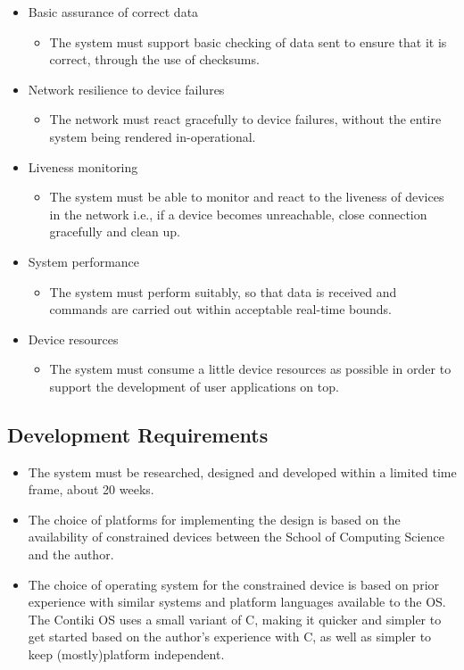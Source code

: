 \begin{itemize}
\begin{itemize}
	\end{itemize}
	\item Basic assurance of correct data
		\begin{itemize}
			\item The system must support basic checking of data sent to ensure that it is correct, through the use of checksums.
		\end{itemize}
	\item Network resilience to device failures
	\begin{itemize}
		\item The network must react gracefully to device failures, without the entire system being rendered in-operational.
	\end{itemize}
	\item Liveness monitoring
	\begin{itemize}
		\item The system must be able to monitor and react to the liveness of devices in the network i.e., if a device becomes unreachable, close connection gracefully and clean up.
	\end{itemize}
	\item System performance
	\begin{itemize}
		\item The system must perform suitably, so that data is received and commands are carried out within acceptable real-time bounds.
	\end{itemize}
	\item Device resources
	\begin{itemize}
		\item The system must consume a little device resources as possible in order to support the development of user applications on top.
	\end{itemize}
\end{itemize}


\subsection{Development Requirements} %
\label{sub:development_requirements}
\begin{itemize}
	\item The system must be researched, designed and developed within a limited time frame, about 20 weeks.
	\item The choice of platforms for implementing the design is based on the availability of constrained devices between the School of Computing Science and the author.
	\item The choice of operating system for the constrained device is based on prior experience with similar systems and platform languages available to the OS. The Contiki OS uses a small variant of C, making it quicker and simpler to get started based on the author's experience with C, as well as simpler to keep (mostly)platform independent.
\end{itemize}

